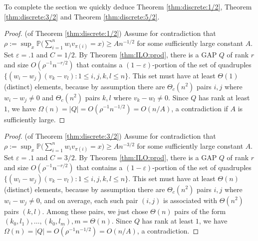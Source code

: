 \documentclass[reqno]{amsart}
\renewcommand\P{{\mathbb{P}}}
\newcommand\eps{{\varepsilon}}
\theoremstyle{plain}
\theoremstyle{definition}
\begin{document}
To complete the section we quickly deduce Theorem \ref{thm:discrete:1/2}, Theorem \ref{thm:discrete:3/2} and Theorem \ref{thm:discrete:5/2}.


\begin{proof}(of Theorem \ref{thm:discrete:1/2}) Assume for contradiction that $\rho:=\sup_{x} \P\big( \sum_{i=1}^n w_i v_{\pi(i)} = x \big) \ge A n^{-1/2}$ for some sufficiently large constant $A$. Set $\eps=.1$ and $C =1/2$. By Theorem \ref{thm:ILO:prod}, there is a GAP $Q$ of rank $r$ and size $O(\rho^{-1}n^{-r/2})$ that contains a $(1-\eps)$-portion of the set of quadruples $\{(w_{i}-w_{j})(v_{k} -v_{l}): 1\le i,j,k,l \le n\}$. This set must have at least $\Theta(1)$ (distinct) elements, because by assumption there are $\Theta_{c}(n^{2})$ pairs $i,j$ where $w_{i}-w_{j} \neq 0$ and $\Theta_{c}(n^{2})$ pairs $k,l$ where $v_{k}-w_{l} \neq 0$.
Since $Q$ has rank at least $1$, we have $\Omega(n)=|Q|=O(\rho^{-1}n^{-1/2}) = O(n/A)$, a contradiction if $A$ is sufficiently large.
\end{proof}


\begin{proof}(of Theorem \ref{thm:discrete:3/2}) Assume for contradiction that $\rho:=\sup_{x} \P\big( \sum_{i=1}^n w_i v_{\pi(i)} = x \big) \ge A n^{-3/2}$ for some sufficiently large constant $A$. Set $\eps=.1$ and $C =
3/2$. By Theorem \ref{thm:ILO:prod}, there is a GAP $Q$ of rank $r$ and size $O(\rho^{-1}n^{-r/2})$ that contains a $(1-\eps)$-portion of the set of quadruples $\{(w_{i}-w_{j})(v_{k} -v_{l}): 1\le i,j,k,l \le n\}$. This set must have at least $\Theta(n)$ (distinct) elements, because by assumption there are $\Theta_{c}(n^{2})$ pairs $i,j$ where $w_{i}-w_{j} \neq 0$, and on average, each such pair $(i,j)$ is associated with $\Theta(n^{2})$ pairs $(k,l)$. Among these pairs, we just chose $\Theta(n)$ pairs of the form $(k_{0},l_{1}),\dots, (k_{0},l_{m}), m = \Theta(n)$. 
Since $Q$ has rank at least $1$, we have $\Omega(n)= |Q|=O(\rho^{-1}n^{-1/2}) = O(n/A)$, a contradiction.
\end{proof}
\end{document}
